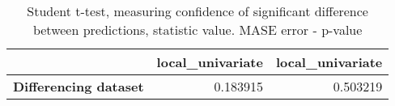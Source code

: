 \begin{table}[h]
\centering
\caption{Student t-test, measuring confidence of significant difference between predictions, statistic value. MASE error - p-value}
\label{table:ttest-p-values-differencing-experiments-MASE}
\begin{tabular}{lrr}
\toprule
{} &  local\_univariate &  local\_univariate \\
\midrule
\textbf{Differencing dataset} &          0.183915 &          0.503219 \\
\bottomrule
\end{tabular}
\end{table}
